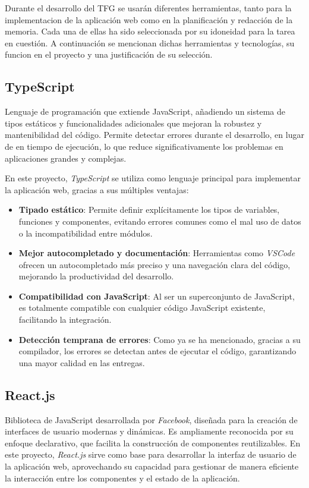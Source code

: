 Durante el desarrollo del TFG se usarán diferentes herramientas, tanto para la implementacion de la aplicación web como en la planificación y redacción de la memoria. Cada una de ellas ha sido seleccionada por su idoneidad para la tarea en cuestión. A continuación se mencionan dichas herramientas y tecnologías, su funcion en el proyecto y una justificación de su selección.

\subsection{TypeScript}
Lenguaje de programación que extiende JavaScript, añadiendo un sistema de tipos estáticos y funcionalidades adicionales que mejoran la robustez y mantenibilidad del código. Permite detectar errores durante el desarrollo, en lugar de en tiempo de ejecución, lo que reduce significativamente los problemas en aplicaciones grandes y complejas.

En este proyecto, \textit{TypeScript} se utiliza como lenguaje principal para implementar la aplicación web, gracias a sus múltiples ventajas:
\begin{itemize}
    \item \textbf{Tipado estático}: Permite definir explícitamente los tipos de variables, funciones y componentes, evitando errores comunes como el mal uso de datos o la incompatibilidad entre módulos.
    \item \textbf{Mejor autocompletado y documentación}: Herramientas como \textit{VSCode} ofrecen un autocompletado más preciso y una navegación clara del código, mejorando la productividad del desarrollo.
    \item \textbf{Compatibilidad con JavaScript}: Al ser un superconjunto de JavaScript, es totalmente compatible con cualquier código JavaScript existente, facilitando la integración.
    \item \textbf{Detección temprana de errores}: Como ya se ha mencionado, gracias a su compilador, los errores se detectan antes de ejecutar el código, garantizando una mayor calidad en las entregas.
\end{itemize}

\subsection{React.js}
Biblioteca de JavaScript desarrollada por \textit{Facebook}, diseñada para la creación de interfaces de usuario modernas y dinámicas. Es ampliamente reconocida por su enfoque declarativo, que facilita la construcción de componentes reutilizables. En este proyecto, \textit{React.js} sirve como base para desarrollar la interfaz de usuario de la aplicación web, aprovechando su capacidad para gestionar de manera eficiente la interacción entre los componentes y el estado de la aplicación.

